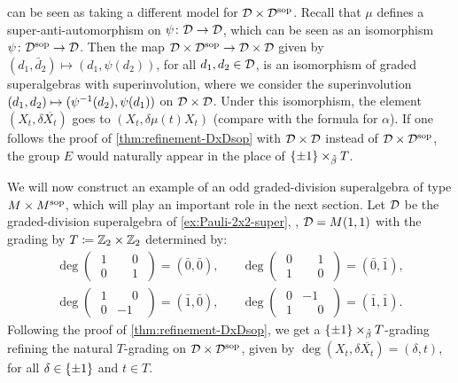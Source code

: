  can be seen as taking a different model for $\mathcal{D} \times \mathcal{D}^{\mathrm{sop}}$. 
Recall that $\mu$ defines a super-anti-automorphism on $\psi\colon \mathcal{D}\to \mathcal{D}$, which can be seen as an isomorphism $\psi\colon \mathcal{D}^{\mathrm{sop}}\to \mathcal{D}$. 
Then the map $\mathcal{D} \times \mathcal{D}^{\mathrm{sop}} \to \mathcal{D} \times \mathcal{D}$ given by $(d_1, \bar{d}_2) \mapsto (d_1, \psi(d_2))$, for all $d_1, d_2 \in \mathcal{D}$, is an isomorphism of graded superalgebras with superinvolution, where we consider the superinvolution $(d_1, d_2) \mapsto (\psi^{-1} (d_2), \psi (d_1))$ on $\mathcal{D} \times \mathcal{D}$. 
Under this isomorphism, the element $(X_t, \delta \overline{X_t})$ goes to $(X_t, \delta\mu(t) X_t)$ (compare with the formula for $\alpha$). 
If one follows the proof of \cref{thm:refinement-DxDsop} with $\mathcal{D}\times \mathcal{D}$ instead of $\mathcal{D} \times \mathcal{D}^{\mathrm{sop}}$, the group $E$ would naturally appear in the place of $\{ \pm 1 \} \times_{\tilde\beta} T$. 

We will now construct an example of
an odd graded-division superalgebra of type $M \times M^{\mathrm{sop}}$, which will play an important role in the next section. 
Let $\mathcal{D}$ be the graded-division superalgebra of \cref{ex:Pauli-2x2-super}, \ie,  $\mathcal{D} = M(1,1)$ with the grading by $T \coloneqq \mathbb{Z}_2 \times \mathbb{Z}_2$ determined by:
\begin{align*}
	\deg \begin{pmatrix}
		\phantom{.}1 & \phantom{-}0\phantom{.} \\
		\phantom{.}0 & \phantom{-}1\phantom{.}
	\end{pmatrix} = (\bar 0, \bar 0),\quad & \deg \begin{pmatrix}
		\phantom{.}0 & \phantom{-}1\phantom{.} \\
		\phantom{.}1 & \phantom{-}0\phantom{.}
	\end{pmatrix} = (\bar 0, \bar 1), \\
	\deg \begin{pmatrix}
		\phantom{.}1 & \phantom{-}0\phantom{.} \\
		\phantom{.}0 & -1\phantom{.}
	\end{pmatrix} = (\bar 1, \bar 0),\quad &
	\deg \begin{pmatrix}
		\phantom{.}0 & -1\phantom{.}           \\
		\phantom{.}1 & \phantom{-}0\phantom{.}
	\end{pmatrix} = (\bar 1, \bar 1).
\end{align*}
%
Following the proof of \cref{thm:refinement-DxDsop}, we get a $\{ \pm 1 \} \times_{\tilde\beta} T$-grading refining the natural $T$-grading on $\mathcal{D} \times \mathcal{D}^{\mathrm{sop}}$, given by $\deg (X_t, \delta \overline{X_t}) = (\delta, t)$, for all $\delta \in \{ \pm 1 \}$ and $t\in T$. 

